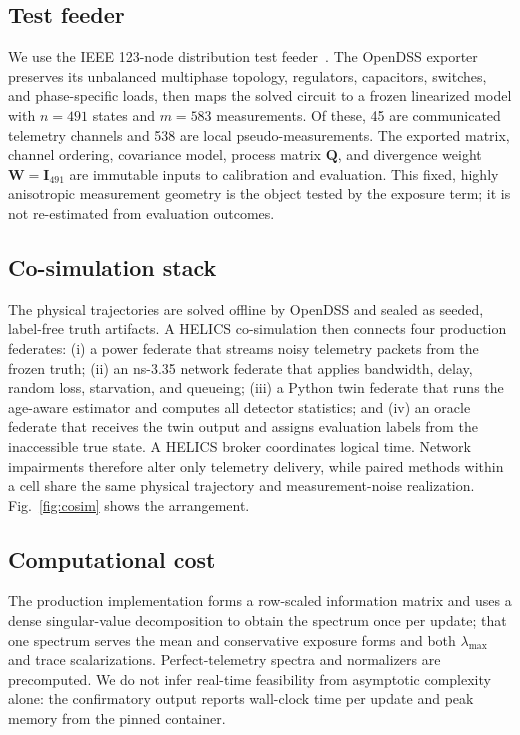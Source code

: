 \documentclass[journal]{IEEEtran}
\theoremstyle{plain}
\theoremstyle{definition}
\theoremstyle{remark}
\newcommand{\bW}{\mathbf{W}}
\newcommand{\bI}{\mathbf{I}}
\newcommand{\lmax}{\lambda_{\max}}
\newcommand{\bQ}{\mathbf{Q}}
\begin{document}
\subsection{Test feeder}
We use the IEEE 123-node distribution test
feeder~\cite{kersting1991,ieee123,dugan2009}. The OpenDSS exporter
preserves its unbalanced multiphase topology, regulators, capacitors,
switches, and phase-specific loads, then maps the solved circuit to a
frozen linearized model with $n=491$ states and $m=583$ measurements. Of
these, 45 are communicated telemetry channels and 538 are local
pseudo-measurements. The exported matrix, channel ordering, covariance
model, process matrix $\bQ$, and divergence weight $\bW=\bI_{491}$ are
immutable inputs to calibration and evaluation. This fixed, highly
anisotropic measurement geometry is the object tested by the exposure
term; it is not re-estimated from evaluation outcomes.

\subsection{Co-simulation stack}
The physical trajectories are solved offline by OpenDSS and sealed as
seeded, label-free truth artifacts. A HELICS co-simulation
\cite{palmintier2017,hardy2024} then connects four production federates:
(i) a power federate that streams noisy telemetry packets from the frozen
truth; (ii) an ns-3.35 network federate that applies bandwidth, delay,
random loss, starvation, and queueing; (iii) a Python twin federate that
runs the age-aware estimator and computes all detector statistics; and
(iv) an oracle federate that receives the twin output and assigns
evaluation labels from the inaccessible true state. A HELICS broker
coordinates logical time. Network impairments therefore alter only
telemetry delivery, while paired methods within a cell share the same
physical trajectory and measurement-noise realization. Fig.~\ref{fig:cosim}
shows the arrangement.

\subsection{Computational cost}
The production implementation forms a row-scaled information matrix and
uses a dense singular-value decomposition to obtain the spectrum once per
update; that one spectrum serves the mean and conservative exposure forms
and both $\lmax$ and trace scalarizations. Perfect-telemetry spectra and
normalizers are precomputed. We do not infer real-time feasibility from
asymptotic complexity alone: the confirmatory output reports wall-clock
time per update and peak memory from the pinned container.
\end{document}

